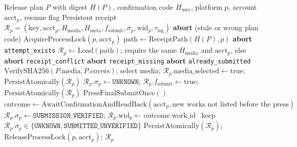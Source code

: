 \begin{algorithm}[htbp]
\caption{Idempotent Cross-Platform Publication \& \texttt{UNKNOWN}-State Latching (\texttt{vpub publish} \& \texttt{vpub verify})}
\label{alg:publish}
\footnotesize
\begin{algorithmic}[1]
\Require Release plan $P$ with digest $H(P)$, confirmation code $H_{\text{user}}$, platform $p$, account $\text{acct}_p$, resume flag
\Ensure Persistent receipt $\mathcal{R}_p = (\text{key}, \text{acct}_p, H_{\text{media}}, H_{\text{meta}}, f_{\text{submit}}, \sigma_p, \text{wid}_p, \tau_{\text{log}})$
 \textbf{abort} (stale or wrong plan code) \EndIf
\State $\text{AcquireProcessLock}(p, \text{acct}_p)$ 
\State $\text{path} \gets \text{ReceiptPath}(H(P), p)$
 \textbf{abort} \texttt{attempt\_exists}  \EndIf
{} $\mathcal{R}_p \gets \text{Load}(\text{path})$; require the same $H_{\text{media}}$ and $\text{acct}_p$, else \textbf{abort} \texttt{receipt\_conflict} \EndIf
{} \textbf{abort} \texttt{receipt\_missing} \EndIf
{} \textbf{abort} \texttt{already\_submitted} \EndIf
\State $\text{VerifySHA256}(P.\text{media}, P.\text{covers})$; select media; $\mathcal{R}_p.\text{media\_selected} \gets \text{true}$; $\text{PersistAtomically}(\mathcal{R}_p)$
\State $\mathcal{R}_p.\sigma_p \gets \texttt{UNKNOWN}$; $\mathcal{R}_p.f_{\text{submit}} \gets \text{true}$; $\text{PersistAtomically}(\mathcal{R}_p)$ 
\State $\text{PressFinalSubmitOnce}()$ 
\State $\text{outcome} \gets \text{AwaitConfirmationAndReadBack}(\text{acct}_p, \text{new works not listed before the press})$
 $\mathcal{R}_p.\sigma_p \gets \texttt{SUBMISSION\_VERIFIED}$; $\mathcal{R}_p.\text{wid}_p \gets \text{outcome}.\text{work\_id}$
\Else\ keep $\mathcal{R}_p.\sigma_p \in \{\texttt{UNKNOWN}, \texttt{SUBMITTED\_UNVERIFIED}\}$ 
\EndIf
\State $\text{PersistAtomically}(\mathcal{R}_p)$; $\text{ReleaseProcessLock}(p, \text{acct}_p)$; \Return $\mathcal{R}_p$
\end{algorithmic}
\end{algorithm}
